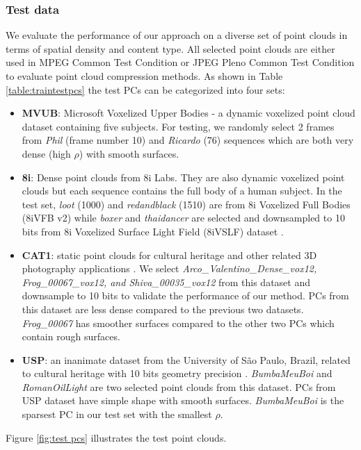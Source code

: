 \subsubsection{Test data} We evaluate the performance of our approach on a diverse set of point clouds in terms of spatial density and content type. All selected point clouds are either used in MPEG Common Test Condition or JPEG Pleno Common Test Condition to evaluate point cloud compression methods. As shown in Table \ref{table:traintestpcs} the test PCs can be categorized into four sets:
\begin{itemize}
    \item \textbf{MVUB}: Microsoft Voxelized Upper Bodies \cite{loop2016microsoft} - a dynamic voxelized point cloud dataset containing five subjects. For testing, we randomly select 2 frames from \textit{Phil} (frame number 10) and \textit{Ricardo} (76) sequences which are both very dense (high $\rho$) with smooth surfaces.
    \item \textbf{8i}: Dense point clouds from 8i Labs. They are also dynamic voxelized point clouds but each sequence contains the full body of a human subject. In the test set, \textit{loot} (1000) and \textit{redandblack} (1510) are from 8i Voxelized Full Bodies (8iVFB v2) \cite{d20178i} while \textit{boxer} and \textit{thaidancer} are selected and downsampled to 10 bits from 8i Voxelized Surface Light Field (8iVSLF) dataset \cite{8i}.
    \item \textbf{CAT1}: static point clouds for cultural heritage and other related 3D photography applications \cite{noauthor_common_nodate}. We select \textit{Arco\_Valentino\_Dense\_vox12, Frog\_00067\_vox12, and Shiva\_00035\_vox12} from this dataset and downsample to 10 bits to validate the performance of our method. PCs from this dataset are less dense compared to the previous two datasets. \textit{Frog\_00067} has smoother surfaces compared to the other two PCs which contain rough surfaces.
    \item \textbf{USP}: an inanimate dataset from the University of S\~ao Paulo, Brazil, related to cultural heritage with 10 bits geometry precision \cite{usp}. \textit{BumbaMeuBoi} and \textit{RomanOilLight} are two selected point clouds from this dataset. PCs from USP dataset have simple shape with smooth surfaces. \textit{BumbaMeuBoi} is the sparsest PC in our test set with the smallest $\rho$. 
\end{itemize}
\par Figure \ref{fig:test pcs} illustrates the test point clouds.



